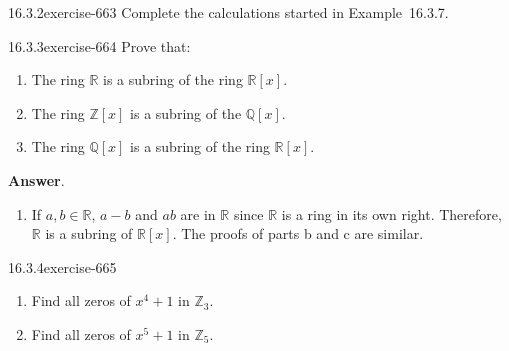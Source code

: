 \documentclass[twoside,10pt,]{book}
\numberwithin{equation}{section}
\begin{document}
\begin{divisionsolution}{16.3.2}{}{exercise-663}%
\hypertarget{p-5976}{}%
Complete the calculations started in Example~16.3.7.%
\end{divisionsolution}%
\begin{divisionsolution}{16.3.3}{}{exercise-664}%
\hypertarget{p-5977}{}%
Prove that:\leavevmode%
\begin{enumerate}[label=(\alph*)]
\item\hypertarget{li-2643}{}\hypertarget{p-5978}{}%
The ring \(\mathbb{R}\) is a subring of the ring \(\mathbb{R}[x]\).%
\item\hypertarget{li-2644}{}\hypertarget{p-5979}{}%
The ring \(\mathbb{Z}[x]\) is a subring of the \(\mathbb{Q}[x]\).%
\item\hypertarget{li-2645}{}\hypertarget{p-5980}{}%
The ring \(\mathbb{Q}[x]\) is a subring of the ring \(\mathbb{R}[x]\).%
\end{enumerate}
%
\par\smallskip%
\noindent\textbf{Answer}.\quad%
\hypertarget{p-5981}{}%
\leavevmode%
\begin{enumerate}[label=(\alph*)]
\item\hypertarget{li-2646}{}\hypertarget{p-5982}{}%
If \(a, b \in  \mathbb{R}\), \(a - b\) and \(a b\) are in \(\mathbb{R}\) since \(\mathbb{R}\) is a ring in its own right. Therefore, \(\mathbb{R}\) is a subring of \(\mathbb{R}[x]\).  The proofs of parts b and c are similar.%
\end{enumerate}
%
\end{divisionsolution}%
\begin{divisionsolution}{16.3.4}{}{exercise-665}%
\hypertarget{p-5983}{}%
\leavevmode%
\begin{enumerate}[label=(\alph*)]
\item\hypertarget{li-2647}{}\hypertarget{p-5984}{}%
Find all zeros of \(x^4+ 1\) in \(\mathbb{Z}_3\).%
\item\hypertarget{li-2648}{}\hypertarget{p-5985}{}%
Find all zeros of \(x^5 + 1\) in \(\mathbb{Z}_5\).%
\end{enumerate}
%
\end{divisionsolution}%
\end{document}
